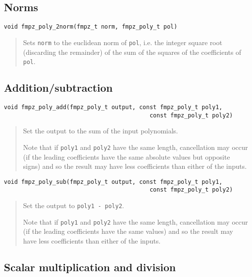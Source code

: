 \documentclass[a4paper,10pt]{article}
\newcommand{\code}{\lstinline}
\begin{document}
\subsection{Norms}

\begin{lstlisting}
void fmpz_poly_2norm(fmpz_t norm, fmpz_poly_t pol)
\end{lstlisting}
\begin{quote}
Sets \code{norm} to the euclidean norm of \code{pol}, i.e. the integer square root (discarding the remainder) of the sum of the squares of the coefficients of \code{pol}.
\end{quote}

\subsection{Addition/subtraction}

\begin{lstlisting}
void fmpz_poly_add(fmpz_poly_t output, const fmpz_poly_t poly1, 
                                          const fmpz_poly_t poly2) 
\end{lstlisting}
\begin{quote}
Set the output to the sum of the input polynomials. 

Note that if \code{poly1} and \code{poly2} have the same length, cancellation may occur (if the leading coefficients have the same absolute values but opposite signs) and so the result may have less coefficients than either of the inputs. 
\end{quote}

\begin{lstlisting}
void fmpz_poly_sub(fmpz_poly_t output, const fmpz_poly_t poly1, 
                                          const fmpz_poly_t poly2) 
\end{lstlisting}
\begin{quote}
Set the output to \code{poly1 - poly2}. 

Note that if \code{poly1} and \code{poly2} have the same length, cancellation may occur (if the leading coefficients have the same values) and so the result may have less coefficients than either of the inputs. 
\end{quote}

\subsection{Scalar multiplication and division}
\end{document}
